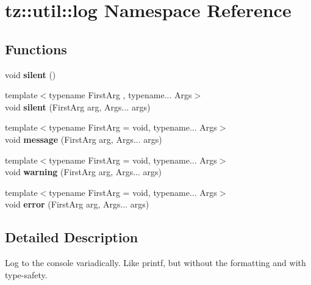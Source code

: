 \hypertarget{namespacetz_1_1util_1_1log}{}\section{tz\+:\+:util\+:\+:log Namespace Reference}
\label{namespacetz_1_1util_1_1log}
\subsection*{Functions}
\begin{DoxyCompactItemize}
\item 
\mbox{\label{namespacetz_1_1util_1_1log_a270877e8374e3e874ed983631f7911aa}} 
void {\bfseries silent} ()
\item 
\mbox{\label{namespacetz_1_1util_1_1log_a32ebd38be6445a5d95ee4062867660db}} 
{\footnotesize template$<$typename First\+Arg , typename... Args$>$ }\\void {\bfseries silent} (First\+Arg arg, Args... args)
\item 
\mbox{\label{namespacetz_1_1util_1_1log_ac0da88857cb3d15aaadbb0038f1f2c73}} 
{\footnotesize template$<$typename First\+Arg  = void, typename... Args$>$ }\\void {\bfseries message} (First\+Arg arg, Args... args)
\item 
\mbox{\label{namespacetz_1_1util_1_1log_af43457666390ef5e3b11a362c84d8b3d}} 
{\footnotesize template$<$typename First\+Arg  = void, typename... Args$>$ }\\void {\bfseries warning} (First\+Arg arg, Args... args)
\item 
\mbox{\label{namespacetz_1_1util_1_1log_a9ba7a9cb5b3368d864ae7a8132974aaf}} 
{\footnotesize template$<$typename First\+Arg  = void, typename... Args$>$ }\\void {\bfseries error} (First\+Arg arg, Args... args)
\end{DoxyCompactItemize}


\subsection{Detailed Description}
Log to the console variadically. Like printf, but without the formatting and with type-\/safety. 